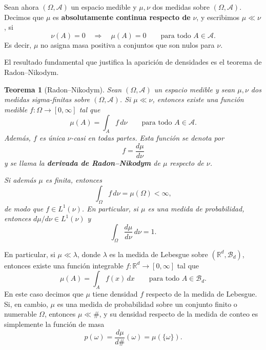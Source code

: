\documentclass[11pt]{report}
\newenvironment{tcolorbox}[1][]{\par\medskip\noindent\ignorespaces}{\par\medskip}
\theoremstyle{definition}
\theoremstyle{plain}
\newtheorem{teorema}[definicion]{Teorema}
\numberwithin{equation}{section}
\begin{document}
Sean ahora \((\Omega,\mathcal{A})\) un espacio medible y \(\mu,\nu\) dos medidas sobre \((\Omega,\mathcal{A})\). Decimos que \(\mu\) es \textbf{absolutamente continua respecto de} \(\nu\), y escribimos \(\mu\ll\nu\), si
\begin{equation*}
    \nu(A)=0
    \quad\Longrightarrow\quad
    \mu(A)=0
    \qquad
    \text{para todo } A\in\mathcal{A}.
\end{equation*}
Es decir, \(\mu\) no asigna masa positiva a conjuntos que son nulos para \(\nu\).

El resultado fundamental que justifica la aparición de densidades es el teorema de Radon--Nikodym.

\begin{tcolorbox}[colback=blue!8, colframe=blue!8, boxrule=0pt]
\begin{teorema}[Radon--Nikodym]
Sean \((\Omega,\mathcal{A})\) un espacio medible y sean \(\mu,\nu\) dos medidas sigma-finitas sobre \((\Omega,\mathcal{A})\). Si \(\mu\ll\nu\), entonces existe una función medible \(f:\Omega\to[0,\infty]\) tal que
\begin{equation*}
    \mu(A)
    =
    \int_A f\,d\nu
    \qquad
    \text{para todo } A\in\mathcal{A}.
\end{equation*}
Además, \(f\) es única \(\nu\)-casi en todas partes. Esta función se denota por
\begin{equation*}
    f=\frac{d\mu}{d\nu}
\end{equation*}
y se llama la \textbf{derivada de Radon--Nikodym} de \(\mu\) respecto de \(\nu\).

Si además \(\mu\) es finita, entonces
\begin{equation*}
    \int_\Omega f\,d\nu
    =
    \mu(\Omega)
    <
    \infty,
\end{equation*}
de modo que \(f\in L^1(\nu)\). En particular, si \(\mu\) es una medida de probabilidad, entonces \(d\mu/d\nu\in L^1(\nu)\) y
\begin{equation*}
    \int_\Omega \frac{d\mu}{d\nu}\,d\nu
    =
    1.
\end{equation*}
\end{teorema}
\end{tcolorbox}

En particular, si \(\mu\ll\lambda\), donde \(\lambda\) es la medida de Lebesgue sobre \((\mathbb{R}^d,\mathcal{B}_d)\), entonces existe una función integrable \(f:\mathbb{R}^d\to[0,\infty]\) tal que
\begin{equation*}
    \mu(A)
    =
    \int_A f(x)\,dx
    \qquad
    \text{para todo } A\in\mathcal{B}_d.
\end{equation*}
En este caso decimos que \(\mu\) tiene densidad \(f\) respecto de la medida de Lebesgue. Si, en cambio, \(\mu\) es una medida de probabilidad sobre un conjunto finito o numerable \(\Omega\), entonces \(\mu\ll \#\), y su densidad respecto de la medida de conteo es simplemente la función de masa
\begin{equation*}
    p(\omega)
    =
    \frac{d\mu}{d\#}(\omega)
    =
    \mu(\{\omega\}).
\end{equation*}
\end{document}
